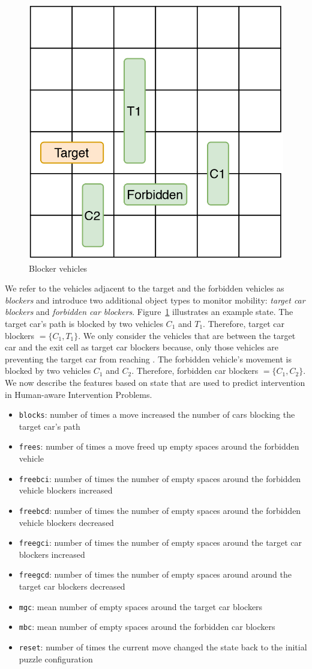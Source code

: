 \begin{figure}[tpb]
  \centering
\includegraphics[width=0.25\columnwidth]{img/figure5.jpg}
  \caption{Blocker vehicles}
  \label{fig:blockers}
\end{figure}
We refer to the vehicles adjacent to the target and the forbidden vehicles as \textit{blockers} and introduce two additional object types to monitor mobility: \textit{target car blockers} and \textit{forbidden car blockers}. 
Figure~\ref{fig:blockers} illustrates an example state. 
The target car’s path is blocked by two vehicles $C_1$ and $T_1$. Therefore, target car blockers $=\lbrace C_1, T_1\rbrace$. 
We only consider the vehicles that are between the target car and the exit cell as target car blockers because, only those vehicles are preventing the target car from reaching \desired. 
The forbidden vehicle’s movement is blocked by two vehicles $C_1$ and $C_2$. 
Therefore, forbidden car blockers $=\lbrace C_1, C_2\rbrace$. 
We now describe the features based on state that are used to predict intervention in Human-aware Intervention Problems.

\begin{itemize}
\item \texttt{blocks}: number of times a move increased the number of cars blocking the target car's path
\item \texttt{frees}: number of times a move freed up empty spaces around the forbidden vehicle
\item \texttt{freebci}: number of times the number of empty spaces around the forbidden vehicle blockers increased
\item \texttt{freebcd}: number of times the number of empty spaces around the forbidden vehicle blockers decreased
\item \texttt{freegci}: number of times the number of empty spaces around the target car blockers increased
\item \texttt{freegcd}: number of times the number of empty spaces around around the target car blockers decreased
\item \texttt{mgc}: mean number of empty spaces around the target car blockers
\item \texttt{mbc}: mean number of empty spaces around the forbidden car blockers
\item \texttt{reset}: number of times the current move changed the state back to the initial puzzle configuration\\
\end{itemize}



